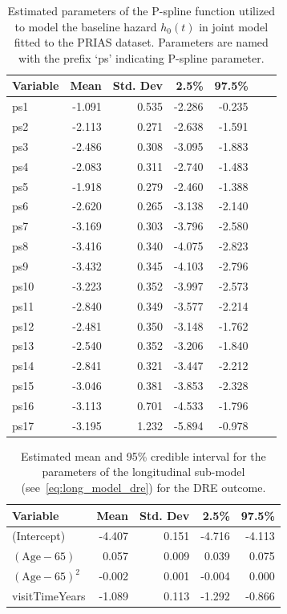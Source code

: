 \begin{table}[!htb]
\begin{center}
\caption{Estimated parameters of the P-spline function utilized to model the baseline hazard $h_0(t)$ in joint model fitted to the PRIAS dataset. Parameters are named with the prefix `ps' indicating P-spline parameter.}
\label{tab:baseline_hazard}
\begin{tabular}{lrrrrrr}
\hline
\hline
Variable                         & Mean & Std. Dev & 2.5\%  & 97.5\%   \\
\hline
ps1  & -1.091 & 0.535 & -2.286 & -0.235 \\
ps2  & -2.113 & 0.271 & -2.638 & -1.591 \\
ps3  & -2.486 & 0.308 & -3.095 & -1.883 \\
ps4  & -2.083 & 0.311 & -2.740 & -1.483 \\
ps5  & -1.918 & 0.279 & -2.460 & -1.388 \\
ps6  & -2.620 & 0.265 & -3.138 & -2.140 \\
ps7  & -3.169 & 0.303 & -3.796 & -2.580 \\
ps8  & -3.416 & 0.340 & -4.075 & -2.823 \\
ps9  & -3.432 & 0.345 & -4.103 & -2.796 \\
ps10 & -3.223 & 0.352 & -3.997 & -2.573 \\
ps11 & -2.840 & 0.349 & -3.577 & -2.214 \\
ps12 & -2.481 & 0.350 & -3.148 & -1.762 \\
ps13 & -2.540 & 0.352 & -3.206 & -1.840 \\
ps14 & -2.841 & 0.321 & -3.447 & -2.212 \\
ps15 & -3.046 & 0.381 & -3.853 & -2.328 \\
ps16 & -3.113 & 0.701 & -4.533 & -1.796 \\
ps17 & -3.195 & 1.232 & -5.894 & -0.978 \\
\hline
\end{tabular}
\end{center}
\end{table}

\begin{table}[!htb]
\begin{center}
\caption{Estimated mean and 95\% credible interval for the parameters of the longitudinal sub-model (see~\ref{eq:long_model_dre}) for the DRE outcome.}
\label{tab:DRE_long}
\begin{tabular}{lrrrr}
\hline
\hline
Variable                         & Mean & Std. Dev & 2.5\%  & 97.5\%   \\
\hline
(Intercept)                      & -4.407 & 0.151 & -4.716 & -4.113 \\
$(\mbox{Age} - 65)$              & 0.057 & 0.009 & 0.039 & 0.075 \\
$(\mbox{Age} - 65)^2$            & -0.002 & 0.001 & -0.004 & 0.000\\
visitTimeYears                   & -1.089 & 0.113 & -1.292 & -0.866 \\
\hline
\end{tabular}
\end{center}
\end{table}

